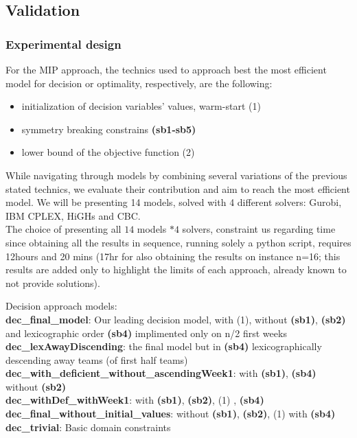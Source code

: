 \documentclass{article}
\begin{document}
\subsection{Validation}

\subsubsection{Experimental design}
For the MIP approach, the technics used to approach best the most efficient model for decision or optimality, respectively,  are the following:
\begin{itemize}
    \item initialization of decision variables' values, warm-start (1)
    \item symmetry breaking constrains \textbf{(sb1-sb5)}
    \item lower bound of the objective function (2)
\end{itemize}
While navigating through models by combining several variations of the previous stated technics, we evaluate their contribution and aim to reach the most efficient model. We will be presenting 14 models, solved with 4 different solvers: Gurobi, IBM CPLEX, HiGHs and CBC.\\
The choice of presenting all $14$ models $*4$ solvers, constraint us regarding time since obtaining all the results in sequence, running solely a python script, requires 12hours and 20 mins (17hr for also obtaining the results on instance n=16; this results are added only to highlight the limits of each approach, already known to not provide solutions).

Decision approach models:\\
\textbf{dec\_final\_model}: Our leading decision model, with (1), without \textbf{(sb1)}, \textbf{(sb2)} and lexicographic order \textbf{(sb4)} implimented only on n/2 first weeks \\
\textbf{dec\_lexAwayDiscending}: the final model but in \textbf{(sb4)} lexicographically descending away teams (of first half teams)\\
\textbf{dec\_with\_deficient\_without\_ascendingWeek1}: with \textbf{(sb1)}, \textbf{(sb4)} without \textbf{(sb2)} \\
\textbf{dec\_withDef\_withWeek1}: with \textbf{(sb1)}, \textbf{(sb2)}, (1) , \textbf{(sb4)}\\
\textbf{dec\_final\_without\_initial\_values}: without \textbf{(sb1)}, \textbf{(sb2)}, (1) with \textbf{(sb4)}\\
\textbf{dec\_trivial}: Basic domain constraints
\end{document}
